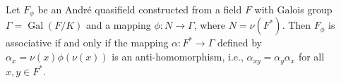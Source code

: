 Let $F_\phi$ be an André quasifield constructed from a field $F$ with Galois group $\Gamma = \operatorname{Gal}(F/K)$ and a mapping $\phi: N \to \Gamma$, where $N = \nu(F^*)$. Then $F_\phi$ is associative if and only if the mapping $\alpha: F^* \to \Gamma$ defined by $\alpha_x = \nu(x)\phi(\nu(x))$ is an anti-homomorphism, i.e., $\alpha_{xy} = \alpha_y \alpha_x$ for all $x, y \in F^*$.
